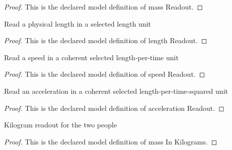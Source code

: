 \begin{proof}
  This is the declared model definition of mass Readout.
\end{proof}
\begin{definition}
  \label{def:physics:phyx-mini-0766:phyxminiproblems-problemphyxmini0766-lengthreadout}
  Read a physical length in a selected length unit
\end{definition}
\begin{proof}
  This is the declared model definition of length Readout.
\end{proof}
\begin{definition}
  \label{def:physics:phyx-mini-0766:phyxminiproblems-problemphyxmini0766-speedreadout}
  Read a speed in a coherent selected length-per-time unit
\end{definition}
\begin{proof}
  This is the declared model definition of speed Readout.
\end{proof}
\begin{definition}
  \label{def:physics:phyx-mini-0766:phyxminiproblems-problemphyxmini0766-accelerationreadout}
  Read an acceleration in a coherent selected length-per-time-squared unit
\end{definition}
\begin{proof}
  This is the declared model definition of acceleration Readout.
\end{proof}
\begin{definition}
  \label{def:physics:phyx-mini-0766:phyxminiproblems-problemphyxmini0766-massinkilograms}
  Kilogram readout for the two people
\end{definition}
\begin{proof}
  This is the declared model definition of mass In Kilograms.
\end{proof}
